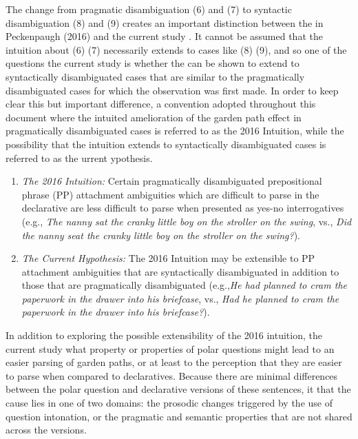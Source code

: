 \documentclass[12pt,oneside]{book}
\begin{document}
The change from pragmatic disambiguation  (6) and (7) to syntactic disambiguation  (8) and (9) creates an important distinction between the  in Peckenpaugh (2016) and  the current study . It cannot be assumed that the intuition about (6)  (7) necessarily extends to cases like (8) (9), and so one of the questions the current study  is whether the  can be shown to extend to syntactically disambiguated cases that are similar to the pragmatically disambiguated cases for which the observation was first made. In order to keep  clear  this  but  important difference, a convention  adopted throughout this document where the intuited amelioration of the garden path effect in pragmatically disambiguated cases is referred to as the 2016 Intuition, while the possibility that the intuition extends to syntactically disambiguated cases is referred to as the urrent ypothesis.


\begin{enumerate}
\def\labelenumi{(\arabic{enumi})}
\setcounter{enumi}{9}
\item
  \emph{The 2016 Intuition:} Certain pragmatically disambiguated prepositional phrase (PP) attachment ambiguities which are difficult to parse in the declarative are less difficult to parse when presented as yes-no interrogatives (e.g., \emph{The nanny sat the cranky little boy on the stroller on the swing}, vs., \emph{Did the nanny seat the cranky little boy on the stroller on the swing?}).
\item
  \emph{The Current Hypothesis:} The 2016 Intuition may be extensible to PP attachment ambiguities that are syntactically disambiguated in addition to those that are pragmatically disambiguated (e.g.,\emph{He had planned to cram the paperwork in the drawer into his briefcase}, vs., \emph{Had he planned to cram the paperwork in the drawer into his briefcase?}).
\end{enumerate}

In addition to exploring the possible extensibility of the 2016 intuition, the current study  what property or properties of polar questions might lead to an easier parsing of garden paths, or at least to the perception that they are easier to parse when compared to declaratives. Because there are minimal differences between the polar question and  declarative versions of these sentences, it  that the cause lies in one of two domains:  the prosodic changes triggered by the use of question intonation, or the pragmatic and semantic properties that are not shared across the versions.
\end{document}

